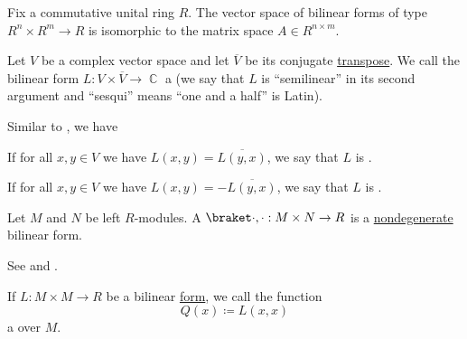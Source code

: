 \begin{corollary}\label{thm:bilinear_forms_isomorphic_to_matrices}
  Fix a commutative unital ring \( R \). The vector space of bilinear forms of type \( R^n \times R^m \to R \) is isomorphic to the matrix space \( A \in R^{n \times m} \).
\end{corollary}

\begin{definition}\label{def:sesquilinear_form}
  Let \( V \) be a complex vector space and let \( \overline V \) be its conjugate \hyperref[def:complex_conjucate_vector_space]{transpose}. We call the bilinear form \( L: V \times \overline V \to \BbbC \) a  (we say that \( L \) is \enquote{semilinear} in its second argument and \enquote{sesqui} means \enquote{one and a half} is Latin).

  Similar to , we have
  \begin{defenum}
     If for all \( x, y \in V \) we have \( L(x, y) = \overline{L(y, x)} \), we say that \( L \) is .

     If for all \( x, y \in V \) we have \( L(x, y) = -\overline{L(y, x)} \), we say that \( L \) is .
  \end{defenum}
\end{definition}

\begin{definition}\label{def:duality_pairing}
  Let \( M \) and \( N \) be left \( R \)-modules. A  \( \inner \cdot \cdot: M \times N \to R \) is a \hyperref[def:nondegenerate_bilinear_form]{nondegenerate} bilinear form.

  See  and .
\end{definition}

\begin{definition}\label{def:quadratic_form}
  If \( L: M \times M \to R \) be a bilinear \hyperref[def:bilinear_form]{form}, we call the function
  \begin{equation*}
    Q(x) \coloneqq L(x, x)
  \end{equation*}
  a  over \( M \).
\end{definition}

\begin{definition}\label{def:quadratic_form_definiteness}
\end{definition}

